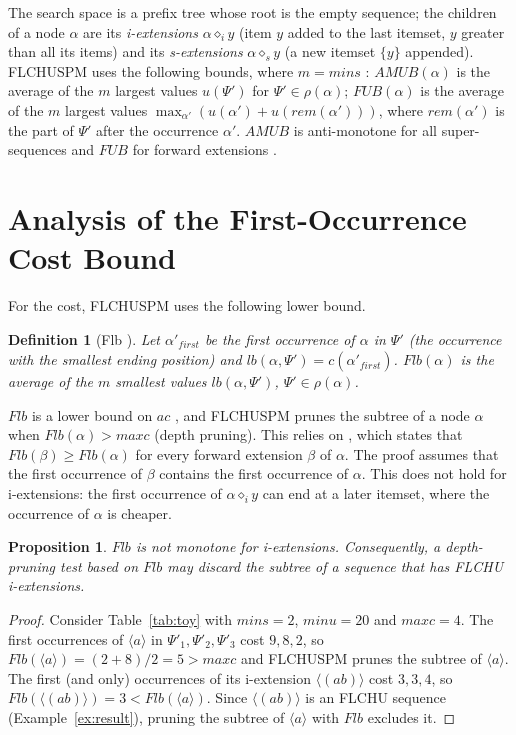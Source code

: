 \documentclass[pdflatex,sn-mathphys,Numbered]{sn-jnl}
\theoremstyle{thmstyleone}
\newtheorem{proposition}[theorem]{Proposition}
\theoremstyle{thmstyletwo}
\theoremstyle{thmstylethree}
\newtheorem{definition}{Definition}
\newcommand{\FL}{\textsc{FLCHUSPM}}
\newcommand{\amub}{\ensuremath{\mathit{AMUB}}}
\newcommand{\fub}{\ensuremath{\mathit{FUB}}}
\newcommand{\flb}{\ensuremath{\mathit{Flb}}}
\newcommand{\ac}{\ensuremath{\mathit{ac}}}
\newcommand{\minu}{\ensuremath{\mathit{minu}}}
\newcommand{\maxc}{\ensuremath{\mathit{maxc}}}
\newcommand{\mins}{\ensuremath{\mathit{mins}}}
\newcommand{\seq}[1]{\langle #1\rangle}
\begin{document}
The search space is a prefix tree whose root is the empty sequence; the children of a node
$\alpha$ are its \emph{i-extensions} $\alpha \diamond_i y$ (item $y$ added to the last itemset,
$y$ greater than all its items) and its \emph{s-extensions} $\alpha \diamond_s y$ (a new itemset
$\{y\}$ appended). \FL{} uses the following bounds, where $m = \mins$ \cite{truong2022}:
$\amub(\alpha)$ is the average of the $m$ largest values $u(\Psi')$ for
$\Psi' \in \rho(\alpha)$; $\fub(\alpha)$ is the average of the $m$ largest values
$\max_{\alpha'}(u(\alpha') + u(\mathit{rem}(\alpha')))$, where $\mathit{rem}(\alpha')$ is the
part of $\Psi'$ after the occurrence $\alpha'$. \amub{} is anti-monotone for all
super-sequences and \fub{} for forward extensions \cite[Theorem~1]{truong2022}.

\section{Analysis of the First-Occurrence Cost Bound}\label{sec:flb}

For the cost, \FL{} uses the following lower bound.

\begin{definition}[Flb {\cite[Def.~6]{truong2022}}]
Let $\alpha'_{\mathit{first}}$ be the first occurrence of $\alpha$ in $\Psi'$ (the occurrence
with the smallest ending position) and $\mathit{lb}(\alpha,\Psi') = c(\alpha'_{\mathit{first}})$.
$\flb(\alpha)$ is the average of the $m$ smallest values $\mathit{lb}(\alpha,\Psi')$,
$\Psi' \in \rho(\alpha)$.
\end{definition}

\flb{} is a lower bound on $\ac$ \cite[Theorem~2a]{truong2022}, and \FL{} prunes the subtree
of a node $\alpha$ when $\flb(\alpha) > \maxc$ (depth pruning). This relies on
\cite[Theorem~2b]{truong2022}, which states that $\flb(\beta) \ge \flb(\alpha)$ for every
forward extension $\beta$ of $\alpha$. The proof assumes that the first occurrence of $\beta$
contains the first occurrence of $\alpha$. This does not hold for i-extensions: the first
occurrence of $\alpha \diamond_i y$ can end at a later itemset, where the occurrence of
$\alpha$ is cheaper.

\begin{proposition}\label{prop:cex}
\flb{} is not monotone for i-extensions. Consequently, a depth-pruning test based on \flb{}
may discard the subtree of a sequence that has FLCHU i-extensions.
\end{proposition}
\begin{proof}
Consider Table~\ref{tab:toy} with $\mins = 2$, $\minu = 20$ and $\maxc = 4$. The first
occurrences of $\seq{a}$ in $\Psi'_1, \Psi'_2, \Psi'_3$ cost $9, 8, 2$, so
$\flb(\seq{a}) = (2 + 8)/2 = 5 > \maxc$ and \FL{} prunes the subtree of $\seq{a}$. The first
(and only) occurrences of its i-extension $\seq{(ab)}$ cost $3, 3, 4$, so
$\flb(\seq{(ab)}) = 3 < \flb(\seq{a})$. Since $\seq{(ab)}$ is an FLCHU sequence
(Example~\ref{ex:result}), pruning the subtree of $\seq{a}$ with \flb{} excludes it.
\end{proof}
\end{document}
